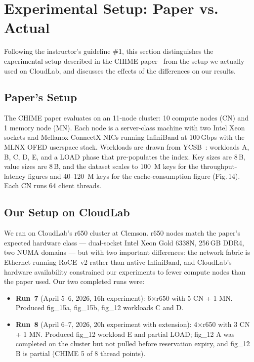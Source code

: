 \documentclass[11pt,a4paper]{article}
\begin{document}
\section{Experimental Setup: Paper vs. Actual}
\label{sec:setup}


Following the instructor's guideline \#1, this section distinguishes the experimental setup described in the CHIME paper~\cite{chime2024} from the setup we actually used on CloudLab, and discusses the effects of the differences on our results.

\subsection{Paper's Setup}

The CHIME paper evaluates on an 11-node cluster: 10 compute nodes (CN) and 1 memory node (MN). Each node is a server-class machine with two Intel Xeon sockets and Mellanox ConnectX NICs running InfiniBand at 100\,Gbps with the MLNX OFED userspace stack. Workloads are drawn from YCSB~\cite{ycsb}: workloads A, B, C, D, E, and a LOAD phase that pre-populates the index. Key sizes are 8\,B, value sizes are 8\,B, and the dataset scales to 100~M keys for the throughput-latency figures and 40--120~M keys for the cache-consumption figure (Fig.\,14). Each CN runs 64 client threads.

\subsection{Our Setup on CloudLab}

We ran on CloudLab's r650 cluster at Clemson. r650 nodes match the paper's expected hardware class --- dual-socket Intel Xeon Gold 6338N, 256\,GB DDR4, two NUMA domains --- but with two important differences: the network fabric is Ethernet running RoCE~v2 rather than native InfiniBand, and CloudLab's hardware availability constrained our experiments to fewer compute nodes than the paper used. Our two completed runs were:

\begin{itemize}[nosep]
    \item \textbf{Run~7} (April 5--6, 2026, 16h experiment): 6$\times$r650 with 5 CN + 1 MN. Produced fig\_15a, fig\_15b, fig\_12 workloads C and D.
    \item \textbf{Run~8} (April 6--7, 2026, 20h experiment with extension): 4$\times$r650 with 3 CN + 1 MN. Produced fig\_12 workload E and partial LOAD; fig\_12 A was completed on the cluster but not pulled before reservation expiry, and fig\_12 B is partial (CHIME 5 of 8 thread points).
\end{itemize}
\end{document}
